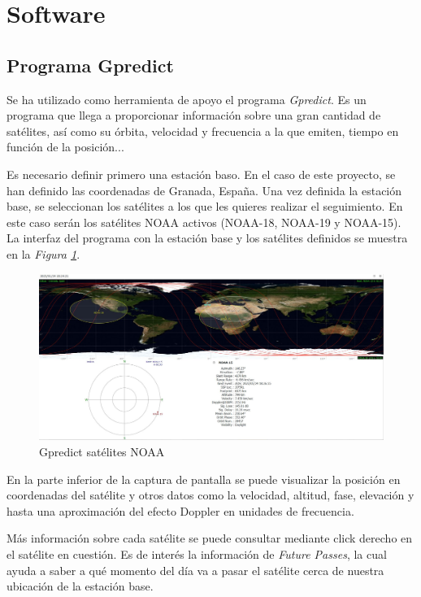 \documentclass[a4paper,openright,12pt]{article}
\begin{document}
\section{Software}

	\subsection{Programa Gpredict}
	Se ha utilizado como herramienta de apoyo el programa \textit{Gpredict}. Es un programa que llega a proporcionar información sobre una gran cantidad de satélites, así como su órbita, velocidad y frecuencia a la que emiten, tiempo en función de la posición...
	
	Es necesario definir primero una estación baso. En el caso de este proyecto, se han definido las coordenadas de Granada, España. Una vez definida la estación base, se seleccionan los satélites a los que les quieres realizar el seguimiento. En este caso serán los satélites NOAA activos (NOAA-18, NOAA-19 y NOAA-15). La interfaz del programa con la estación base y los satélites definidos se muestra en la \textit{Figura \ref{gpredict}}.
	
	\begin{figure}[hbtp]
 \centering
 \includegraphics[width = 16cm]{imagenes/Gpredict_NOAA.JPG}
 \caption{Gpredict satélites NOAA}
 \label{gpredict}
 \end{figure}
 
 En la parte inferior de la captura de pantalla se puede visualizar la posición en coordenadas del satélite y otros datos como la velocidad, altitud, fase, elevación y hasta una aproximación del efecto Doppler en unidades de frecuencia.
 
 Más información sobre cada satélite se puede consultar mediante click derecho en el satélite en cuestión. Es de interés la información de \textit{Future Passes}, la cual ayuda a saber a qué momento del día va a pasar el satélite cerca de nuestra ubicación de la estación base.
\end{document}

